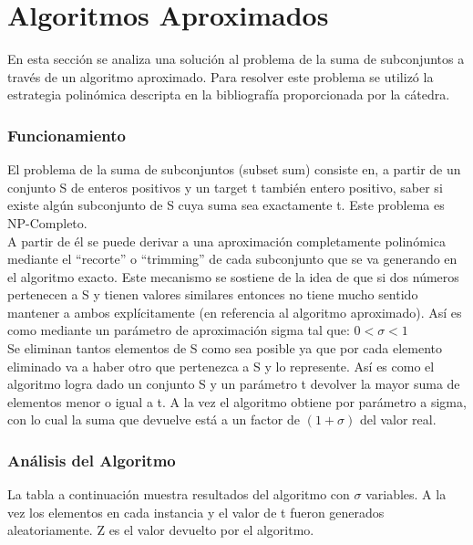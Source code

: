 \documentclass[a4paper, 10pt]{article}
\newcommand\tab[1][0.5cm]{\hspace*{#1}}
\begin{document}
    \section{Algoritmos Aproximados}
        \tab En esta sección se analiza una solución al problema de la suma de subconjuntos
        a través de un algoritmo aproximado. Para resolver este problema se utilizó la
        estrategia polinómica descripta en la bibliografía proporcionada por la cátedra.
            \subsubsection{Funcionamiento}
                \tab El problema de la suma de subconjuntos (subset sum) consiste en, a partir de un conjunto S de enteros
                positivos y un target t también entero positivo, saber si existe algún subconjunto de S cuya suma sea
                exactamente t. Este problema es NP-Completo.\\
                \tab A partir de él se puede derivar a una aproximación completamente polinómica mediante el “recorte” o
                “trimming” de cada subconjunto que se va generando en el algoritmo exacto. Este mecanismo se sostiene de
                la idea de que si dos números pertenecen a S y tienen valores similares entonces no tiene mucho sentido
                mantener a ambos explícitamente (en referencia al algoritmo aproximado). Así es como mediante un parámetro
                de aproximación sigma tal que:
                                                            $0 < \sigma < 1$ \\
                \tab Se eliminan tantos elementos de S como sea posible ya que por cada elemento eliminado va a haber otro
                que pertenezca a S y lo represente. Así es como el algoritmo logra dado un conjunto S y un parámetro t
                devolver la mayor suma de elementos menor o igual a t. A la vez el algoritmo obtiene por parámetro a sigma,
                con lo cual la suma que devuelve está a un factor de $(1 + \sigma)$ del valor real.\\
            \subsubsection{Análisis del Algoritmo}
                \tab La tabla a continuación muestra resultados del algoritmo con $\sigma$ variables. A la vez los elementos
                en cada instancia y el valor de t fueron generados aleatoriamente. Z es el valor devuelto por el algoritmo.
\end{document}
